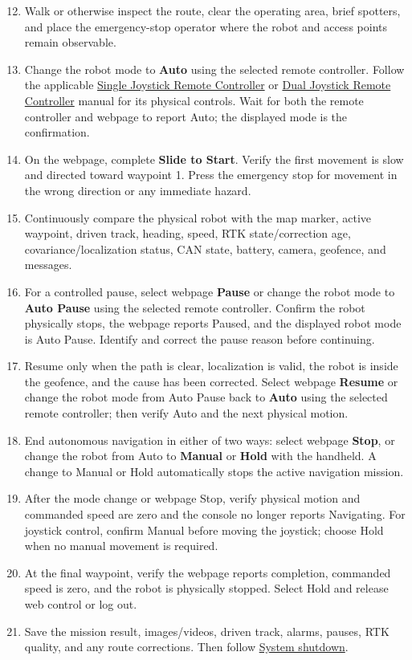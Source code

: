 \documentclass[
  10pt,
  letterpaper,
  openany]{report}
\providecommand{\tightlist}{%
  \setlength{\itemsep}{0pt}\setlength{\parskip}{0pt}}
\begin{document}
\begin{enumerate}
\setcounter{enumi}{11}
\tightlist
\item
  Walk or otherwise inspect the route, clear the operating area, brief
  spotters, and place the emergency-stop operator where the robot and
  access points remain observable.
\item
  Change the robot mode to \textbf{Auto} using the selected remote
  controller. Follow the applicable \hyperref[remote-operation]{Single
  Joystick Remote Controller} or \hyperref[custom-operation]{Dual
  Joystick Remote Controller} manual for its physical controls. Wait for
  both the remote controller and webpage to report Auto; the displayed
  mode is the confirmation.
\item
  On the webpage, complete \textbf{Slide to Start}. Verify the first
  movement is slow and directed toward waypoint 1. Press the emergency
  stop for movement in the wrong direction or any immediate hazard.
\item
  Continuously compare the physical robot with the map marker, active
  waypoint, driven track, heading, speed, RTK state/correction age,
  covariance/localization status, CAN state, battery, camera, geofence,
  and messages.
\item
  For a controlled pause, select webpage \textbf{Pause} or change the
  robot mode to \textbf{Auto Pause} using the selected remote
  controller. Confirm the robot physically stops, the webpage reports
  Paused, and the displayed robot mode is Auto Pause. Identify and
  correct the pause reason before continuing.
\item
  Resume only when the path is clear, localization is valid, the robot
  is inside the geofence, and the cause has been corrected. Select
  webpage \textbf{Resume} or change the robot mode from Auto Pause back
  to \textbf{Auto} using the selected remote controller; then verify
  Auto and the next physical motion.
\item
  End autonomous navigation in either of two ways: select webpage
  \textbf{Stop}, or change the robot from Auto to \textbf{Manual} or
  \textbf{Hold} with the handheld. A change to Manual or Hold
  automatically stops the active navigation mission.
\item
  After the mode change or webpage Stop, verify physical motion and
  commanded speed are zero and the console no longer reports Navigating.
  For joystick control, confirm Manual before moving the joystick;
  choose Hold when no manual movement is required.
\item
  At the final waypoint, verify the webpage reports completion,
  commanded speed is zero, and the robot is physically stopped. Select
  Hold and release web control or log out.
\item
  Save the mission result, images/videos, driven track, alarms, pauses,
  RTK quality, and any route corrections. Then follow
  \hyperref[operations-shutdown]{System shutdown}.
\end{enumerate}
\end{document}
